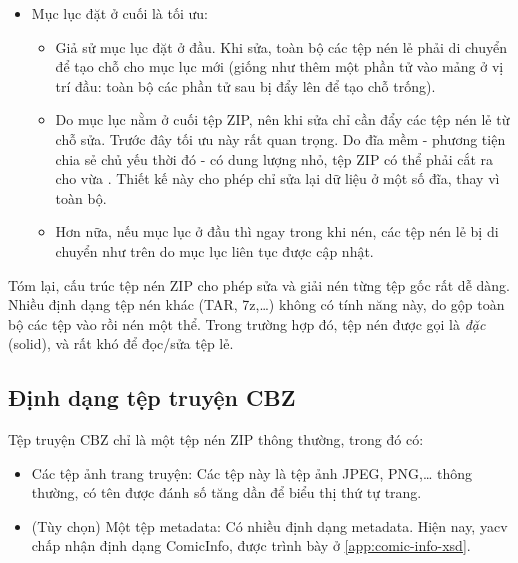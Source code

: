 \documentclass[../../thesis]{subfiles}
\begin{document}
\begin{itemize}[resume, before = \vspace*{-\dimexpr\topsep+\partopsep\relax}]
    \item
        Mục lục đặt ở cuối là tối ưu:

        \begin{itemize}
            \item
                Giả sử mục lục đặt ở đầu. Khi sửa, toàn bộ các tệp nén lẻ phải
                di chuyển để tạo chỗ cho mục lục mới (giống như thêm một phần tử
                vào mảng ở vị trí đầu: toàn bộ các phần tử sau bị đẩy lên để tạo
                chỗ trống).
            \item
                Do mục lục nằm ở cuối tệp ZIP, nên khi sửa chỉ cần đẩy các tệp
                nén lẻ từ chỗ sửa. Trước đây tối ưu này rất quan trọng. Do đĩa
                mềm - phương tiện chia sẻ chủ yếu thời đó - có dung lượng nhỏ,
                tệp ZIP có thể phải cắt ra cho vừa \cite{WIKI_ZIP}. Thiết kế này
                cho phép chỉ sửa lại dữ liệu ở một số đĩa, thay vì toàn bộ.
            \item
                Hơn nữa, nếu mục lục ở đầu thì ngay trong khi nén, các tệp nén
                lẻ bị di chuyển như trên do mục lục liên tục được cập nhật.
        \end{itemize}
\end{itemize}

Tóm lại, cấu trúc tệp nén ZIP cho phép sửa và giải nén từng tệp gốc rất dễ dàng.
Nhiều định dạng tệp nén khác (TAR, 7z,\ldots) không có tính năng này, do gộp
toàn bộ các tệp vào rồi nén một thể. Trong trường hợp đó, tệp nén được gọi là
\emph{đặc} (solid), và rất khó để đọc/sửa tệp lẻ.

\subsection{Định dạng tệp truyện CBZ}\label{sec:cbz}

Tệp truyện CBZ chỉ là một tệp nén ZIP thông thường, trong đó có:

\begin{itemize}
    \item
        Các tệp ảnh trang truyện: Các tệp này là tệp ảnh JPEG, PNG,\ldots{}
        thông thường, có tên được đánh số tăng dần để biểu thị thứ tự trang.
    \item
        (Tùy chọn) Một tệp metadata: Có nhiều định dạng metadata. Hiện nay, yacv
        chấp nhận định dạng ComicInfo, được trình bày ở
        \autoref{app:comic-info-xsd}.
\end{itemize}
\end{document}

